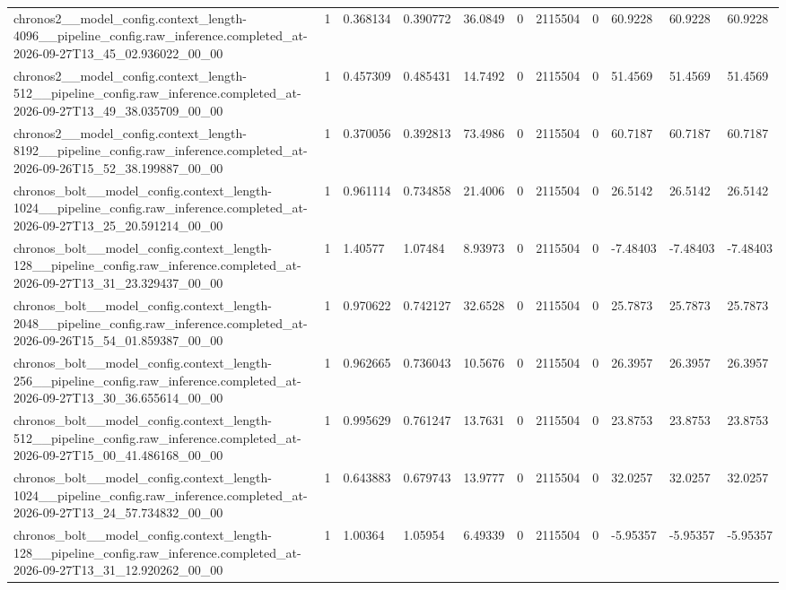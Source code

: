 \begin{tabular}{lllllllllll}
chronos2\_\_model\_config.context\_length-4096\_\_pipeline\_config.raw\_inference.completed\_at-2026-09-27T13\_45\_02.936022\_00\_00 & 1 & 0.368134 & 0.390772 & 36.0849 & 0 & 2115504 & 0 & 60.9228 & 60.9228 & 60.9228 \\
chronos2\_\_model\_config.context\_length-512\_\_pipeline\_config.raw\_inference.completed\_at-2026-09-27T13\_49\_38.035709\_00\_00 & 1 & 0.457309 & 0.485431 & 14.7492 & 0 & 2115504 & 0 & 51.4569 & 51.4569 & 51.4569 \\
chronos2\_\_model\_config.context\_length-8192\_\_pipeline\_config.raw\_inference.completed\_at-2026-09-26T15\_52\_38.199887\_00\_00 & 1 & 0.370056 & 0.392813 & 73.4986 & 0 & 2115504 & 0 & 60.7187 & 60.7187 & 60.7187 \\
chronos\_bolt\_\_model\_config.context\_length-1024\_\_pipeline\_config.raw\_inference.completed\_at-2026-09-27T13\_25\_20.591214\_00\_00 & 1 & 0.961114 & 0.734858 & 21.4006 & 0 & 2115504 & 0 & 26.5142 & 26.5142 & 26.5142 \\
chronos\_bolt\_\_model\_config.context\_length-128\_\_pipeline\_config.raw\_inference.completed\_at-2026-09-27T13\_31\_23.329437\_00\_00 & 1 & 1.40577 & 1.07484 & 8.93973 & 0 & 2115504 & 0 & -7.48403 & -7.48403 & -7.48403 \\
chronos\_bolt\_\_model\_config.context\_length-2048\_\_pipeline\_config.raw\_inference.completed\_at-2026-09-26T15\_54\_01.859387\_00\_00 & 1 & 0.970622 & 0.742127 & 32.6528 & 0 & 2115504 & 0 & 25.7873 & 25.7873 & 25.7873 \\
chronos\_bolt\_\_model\_config.context\_length-256\_\_pipeline\_config.raw\_inference.completed\_at-2026-09-27T13\_30\_36.655614\_00\_00 & 1 & 0.962665 & 0.736043 & 10.5676 & 0 & 2115504 & 0 & 26.3957 & 26.3957 & 26.3957 \\
chronos\_bolt\_\_model\_config.context\_length-512\_\_pipeline\_config.raw\_inference.completed\_at-2026-09-27T15\_00\_41.486168\_00\_00 & 1 & 0.995629 & 0.761247 & 13.7631 & 0 & 2115504 & 0 & 23.8753 & 23.8753 & 23.8753 \\
chronos\_bolt\_\_model\_config.context\_length-1024\_\_pipeline\_config.raw\_inference.completed\_at-2026-09-27T13\_24\_57.734832\_00\_00 & 1 & 0.643883 & 0.679743 & 13.9777 & 0 & 2115504 & 0 & 32.0257 & 32.0257 & 32.0257 \\
chronos\_bolt\_\_model\_config.context\_length-128\_\_pipeline\_config.raw\_inference.completed\_at-2026-09-27T13\_31\_12.920262\_00\_00 & 1 & 1.00364 & 1.05954 & 6.49339 & 0 & 2115504 & 0 & -5.95357 & -5.95357 & -5.95357 \\

\end{tabular}
